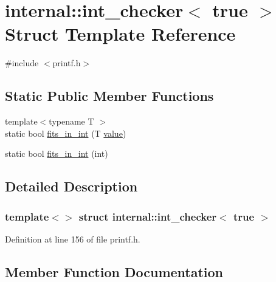 \hypertarget{structinternal_1_1int__checker_3_01true_01_4}{}\section{internal\+:\+:int\+\_\+checker$<$ true $>$ Struct Template Reference}
\label{structinternal_1_1int__checker_3_01true_01_4}


{\ttfamily \#include $<$printf.\+h$>$}

\subsection*{Static Public Member Functions}
\begin{DoxyCompactItemize}
\item 
{\footnotesize template$<$typename T $>$ }\\static bool \hyperlink{structinternal_1_1int__checker_3_01true_01_4_a647ab37e3fdce73c988478434f3a8203}{fits\+\_\+in\+\_\+int} (T \hyperlink{classinternal_1_1value}{value})
\item 
static bool \hyperlink{structinternal_1_1int__checker_3_01true_01_4_a253ca9ccc6a67e83bc66276e75e798fb}{fits\+\_\+in\+\_\+int} (int)
\end{DoxyCompactItemize}


\subsection{Detailed Description}
\subsubsection*{template$<$$>$\newline
struct internal\+::int\+\_\+checker$<$ true $>$}



Definition at line 156 of file printf.\+h.



\subsection{Member Function Documentation}
\mbox{\label{structinternal_1_1int__checker_3_01true_01_4_a647ab37e3fdce73c988478434f3a8203}} 
